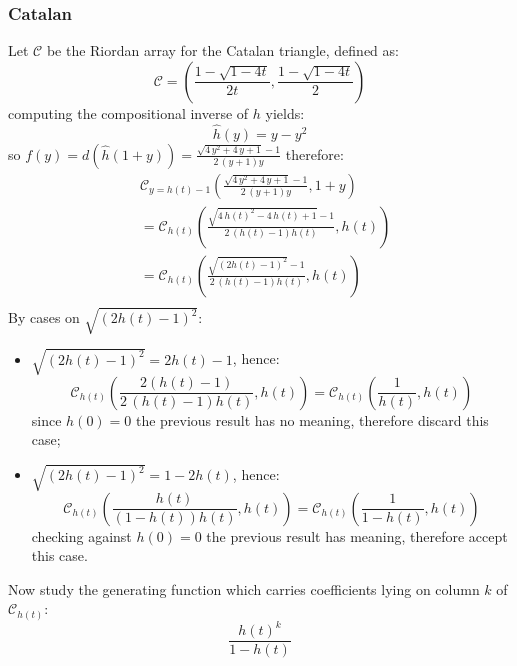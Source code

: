 \documentclass[11pt,a4paper]{article} %
\begin{document}
    \subsubsection{Catalan}
    Let $\mathcal{C}$ be the Riordan array for the Catalan triangle,
    defined as:
    \begin{displaymath} 
        \mathcal{C} = \left(\frac{1-\sqrt{1-4t}}{2t}, \frac{1-\sqrt{1-4t}}{2}  \right)
    \end{displaymath} 
    computing the compositional inverse of $h$ yields:
    \begin{displaymath} 
        \hat{h}(y) = y - y^2
    \end{displaymath} 
    so $f(y)=d(\hat{h}(1+y))=\frac{\sqrt{4 \, y^{2} + 4 \, y + 1} - 1}{2 \, {\left(y + 1\right)} y}$ therefore:
    \begin{displaymath} 
        \begin{split} 
            &\mathcal{C}_{y=h(t)-1}\left(\frac{\sqrt{4 \, y^{2} + 4 \, y + 1} - 1}{2 \, {\left(y + 1\right)} y}, 1+y \right) \\
            &= \mathcal{C}_{h(t)}\left(\frac{\sqrt{4 \, h\left(t\right)^{2} - 4 \, h\left(t\right) + 1} - 1}{2 \, {\left(h\left(t\right) - 1\right)} h\left(t\right)}, h(t) \right)\\
            &= \mathcal{C}_{h(t)}\left(\frac{\sqrt{(2 h\left(t\right) -  1)^2} - 1}{2 \, {\left(h\left(t\right) - 1\right)} h\left(t\right)}, h(t) \right)\\
        \end{split} 
    \end{displaymath} 
    By cases on $\sqrt{(2 h\left(t\right) -  1)^2}$:
    \begin{itemize}
        \item $\sqrt{(2 h\left(t\right) -  1)^2}=2 h\left(t\right) -  1$, hence:
            \begin{displaymath} 
                \mathcal{C}_{h(t)}\left(\frac{2(h\left(t\right) -  1)}{2 \, {\left(h\left(t\right) - 1\right)} h\left(t\right)}, h(t) \right)=
                \mathcal{C}_{h(t)}\left(\frac{1}{h\left(t\right)}, h(t) \right)
            \end{displaymath} 
            since $h(0)=0$ the previous result has no meaning, therefore discard this case;
        \item $\sqrt{(2 h\left(t\right) -  1)^2}=1 -2 h\left(t\right)$, hence:
            \begin{displaymath} 
                \mathcal{C}_{h(t)}\left(\frac{h\left(t\right)}{ {\left(1-h\left(t\right) \right)} h\left(t\right)}, h(t) \right)=
                \mathcal{C}_{h(t)}\left(\frac{1}{1-h\left(t\right)}, h(t) \right)
            \end{displaymath} 
            checking against $h(0)=0$ the previous result has meaning, therefore accept this case.
    \end{itemize}
    Now study the generating function which carries coefficients lying on column $k$
    of $\mathcal{C}_{h(t)}$:
    \begin{displaymath} 
        \frac{h(t)^{k}}{1-h\left(t\right)} 
    \end{displaymath} 
\end{document}
